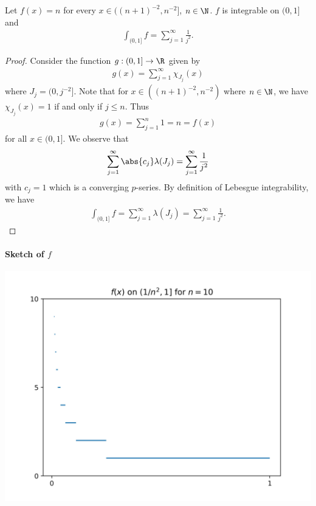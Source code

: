 \documentclass{article}
\begin{document}
\begin{claim*}
   Let $f(x)=n$ for every $x\in((n+1)^{-2}, n^{-2}]$, $n\in\N$. $f$ is integrable on $(0,1]$
   and 
   \begin{align*}
      \int_{(0, 1]} f = \sum_{j=1}^\infty \frac{1}{j^2}.
   \end{align*}
\end{claim*}
\begin{proof}
   Consider the function $g:(0,1]\to\R$ given by 
   \begin{align*}
      g(x) = \sum_{j=1}^\infty \chi_{J_j}(x)
   \end{align*}
   where $J_j = (0, j^{-2}]$. Note that for $x\in((n+1)^{-2}, n^{-2})$ where $n\in\N$,
   we have $\chi_{J_j}(x)=1$ if and only if $j\leq n$. Thus 
   \begin{align*}
      g(x) = \sum_{j=1}^n 1 = n = f(x)
   \end{align*}
   for all $x\in(0,1]$. We observe that 
   \begin{align*}
      \sum_{j=1}^\infty \abs{c_j} \lambda(J_j) = \sum_{j=1}^\infty \frac{1}{j^2}
   \end{align*}
   with $c_j=1$ which is a converging $p$-series. By definition of Lebesgue integrability,
   we have 
   \begin{align*}
      \int_{(0,1]} f = \sum_{j=1}^\infty \lambda(J_j) = \sum_{j=1}^\infty \frac{1}{j^2}.
   \end{align*}
\end{proof}

\paragraph{Sketch of $f$}

\begin{center}
\includegraphics[width=15.5cm]{sketch.jpg}
\end{center}
\end{document}
